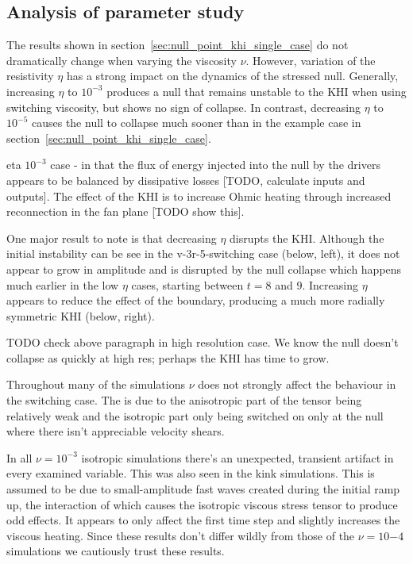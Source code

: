 
\subsection{Analysis of parameter study}

The results shown in section~\ref{sec:null_point_khi_single_case} do not dramatically change when varying the viscosity $\nu$. However, variation of the resistivity $\eta$ has a strong impact on the dynamics of the stressed null. Generally, increasing $\eta$ to $10^{-3}$ produces a null that remains unstable to the KHI when using switching viscosity, but shows no sign of collapse. In contrast, decreasing $\eta$ to $10^{-5}$ causes the null to collapse much sooner than in the example case in section~\ref{sec:null_point_khi_single_case}. 

eta $10^{-3}$ case - in that the flux of energy injected into the null by the drivers appears to be balanced by dissipative losses [TODO, calculate inputs and outputs]. The effect of the KHI is to increase Ohmic heating through increased reconnection in the fan plane [TODO show this].

One major result to note is that decreasing $\eta$ disrupts the KHI. Although the initial instability can be see in the v-3r-5-switching case (below, left), it does not appear to grow in amplitude and is disrupted by the null collapse which happens much earlier in the low $\eta$ cases, starting between $t=8$ and $9$. Increasing $\eta$ appears to reduce the effect of the boundary, producing a much more radially symmetric KHI (below, right).

TODO check above paragraph in high resolution case. We know the null doesn't collapse as quickly at high res; perhaps the KHI has time to grow.

Throughout many of the simulations $\nu$ does not strongly affect the behaviour in the switching case. The is due to the anisotropic part of the tensor being relatively weak and the isotropic part only being switched on only at the null where there isn't appreciable velocity shears.

In all $\nu = 10^{-3}$ isotropic simulations there's an unexpected, transient artifact in every examined variable. This was also seen in the kink simulations. This is assumed to be due to small-amplitude fast waves created during the initial ramp up, the interaction of which causes the isotropic viscous stress tensor to produce odd effects. It appears to only affect the first time step and slightly increases the viscous heating. Since these results don't differ wildly from those of the $\nu=10{-4}$ simulations we cautiously trust these results.

